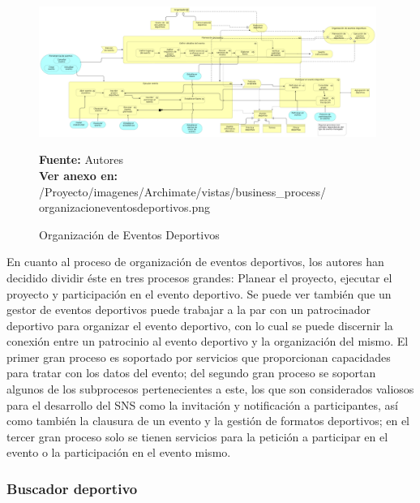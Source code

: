 \begin{figure}[!htb]
  \begin{center}
    \includegraphics[width=11cm]{./imagenes/Archimate/vistas/business_process/organizacioneventosdeportivos.png}
    \caption{Organización de Eventos Deportivos}
    \label{fig:bp_organizacion_eventos_deportivos}
    \textbf{Fuente:}  Autores \\
    \textbf{Ver anexo en:} /Proyecto/imagenes/Archimate/vistas/business\_process/
    organizacioneventosdeportivos.png
  \end{center}
\end{figure}

En cuanto al proceso de organización de eventos deportivos, los autores han decidido dividir éste en tres procesos grandes: Planear el proyecto, ejecutar el proyecto y participación en el evento deportivo. Se puede ver también que un gestor de eventos deportivos puede trabajar a la par con un patrocinador deportivo para organizar el evento deportivo, con lo cual se puede discernir la conexión entre un patrocinio al evento deportivo y la organización del mismo. El primer gran proceso es soportado por servicios que proporcionan capacidades para tratar con los datos del evento; del segundo gran proceso se soportan algunos de los subprocesos pertenecientes a este, los que son considerados valiosos para el desarrollo del SNS como la invitación y notificación a participantes, así como también la clausura de un evento y la gestión de formatos deportivos; en el tercer gran proceso solo se tienen servicios para la petición a participar en el evento o la participación en el evento mismo.

\subsubsection{Buscador deportivo}

